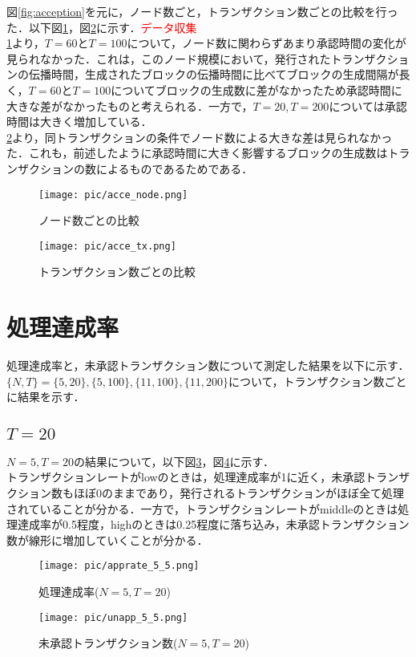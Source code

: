 \documentclass[japanese, macos]{KU2}
\begin{document}
図\ref{fig:acception}を元に，ノード数ごと，トランザクション数ごとの比較を行った．以下図\ref{fig:acce_node}，図\ref{fig:acce_tx}に示す．\textcolor{red}{データ収集}\\
\ref{fig:acce_node}より，$T = 60とT=100$について，ノード数に関わらずあまり承認時間の変化が見られなかった．これは，このノード規模において，発行されたトランザクションの伝播時間，生成されたブロックの伝播時間に比べてブロックの生成間隔が長く，$T = 60とT=100$についてブロックの生成数に差がなかったため承認時間に大きな差がなかったものと考えられる．一方で，$T=20,T=200$については承認時間は大きく増加している．\\
\ref{fig:acce_tx}より，同トランザクションの条件でノード数による大きな差は見られなかった．これも，前述したように承認時間に大きく影響するブロックの生成数はトランザクションの数によるものであるためである．

\begin{figure}[htbp]
  \begin{center}
   \texttt{[image: pic/acce\_node.png]}
  \caption{ノード数ごとの比較}
  \label{fig:acce_node}
  \end{center}
\end{figure}
\begin{figure}[htbp]
  \begin{center}
   \texttt{[image: pic/acce\_tx.png]}
  \caption{トランザクション数ごとの比較}
  \label{fig:acce_tx}
    \end{center}
\end{figure}

\section{処理達成率}
処理達成率と，未承認トランザクション数について測定した結果を以下に示す．$\{N,T\} = \{5,20\},\{5,100\},\{11,100\},\{11,200\}$について，トランザクション数ごとに結果を示す．
\subsection{$T  =  20$}
$N=5,T = 20$の結果について，以下図\ref{fig:apprate_5_5}，図\ref{fig:unapp_5_5}に示す．\\
トランザクションレートがlowのときは，処理達成率が1に近く，未承認トランザクション数もほぼ0のままであり，発行されるトランザクションがほぼ全て処理されていることが分かる．一方で，トランザクションレートがmiddleのときは処理達成率が0.5程度，highのときは0.25程度に落ち込み，未承認トランザクション数が線形に増加していくことが分かる．
\begin{figure}[htbp]
  \begin{center}
   \texttt{[image: pic/apprate\_5\_5.png]}
  \end{center}
  \caption{処理達成率($N=5,T=20$)}
  \label{fig:apprate_5_5}
\end{figure}
\begin{figure}[htbp]
  \begin{center}
   \texttt{[image: pic/unapp\_5\_5.png]}
  \end{center}
  \caption{未承認トランザクション数($N=5,T=20$)}
  \label{fig:unapp_5_5}
\end{figure}
\end{document}
